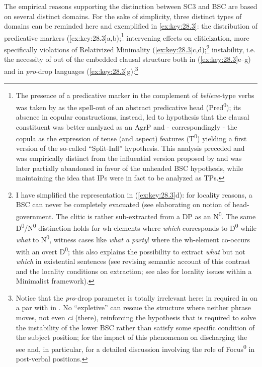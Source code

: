 \documentclass[output=paper]{langsci/langscibook}
\begin{document}
The empirical reasons supporting the distinction between \gls{SC3} and
\gls{BSC} are based on several distinct domains. For the sake of simplicity,
three distinct types of domains can be reminded here and exemplified in
\eqref{ex:key:28.3}: the distribution of predicative markers
(\ref{ex:key:28.3}a,b);\footnote{The presence of a predicative
    marker in the complement of \emph{believe}-type verbs was taken by
    \citet{Moro1988} as the spell-out of an abstract
    predicative head (Pred\textsuperscript{0}); its absence in
    copular constructions, instead, led to hypothesis that the
    clausal constituent was better analyzed as an AgrP and - correspondingly -
    the copula as the expression of tense (and aspect) features
    (T\textsuperscript{0}) yielding a first version of the so-called
    “Split-Infl” hypothesis. This analysis preceded and was empirically
    distinct from the influential version proposed by \citet{Pollock1989} and
was later partially abandoned in favor of the unheaded \gls{BSC} hypothesis,
while maintaining the idea that IPs were in fact to be analyzed as TPs.}
intervening effects on cliticization, more specifically violations of
 Relativized Minimality (\ref{ex:key:28.3}c,d);\footnote{I
    have simplified the representation in (\ref{ex:key:28.3}d): for locality
    reasons, a \gls{BSC} can never be completely evacuated (see
    \citet{Moro1993} elaborating on  notion of
    head-government. The clitic is rather sub-extracted from a DP as an
    N\textsuperscript{0}. The same D\textsuperscript{0}/N\textsuperscript{0}
    distinction holds for wh-elements where \emph{which} corresponds to
    D\textsuperscript{0} while \emph{what} to N\textsuperscript{0}, witness
    cases like \emph{what a party}! where the wh-element co-occurs with an
    overt D\textsuperscript{0}; this also explains the possibility to extract
    \emph{what} but not \emph{which} in existential sentences (see
    \citealt{Moro1997} revising  semantic account of this contrast
    and the locality conditions on extraction; see also \citealt{Moro1993} for
locality issues within a Minimalist framework).} instability, i.e. the
necessity of  out of the embedded clausal structure both in 
(\ref{ex:key:28.3}e--g) and in \emph{pro}-drop languages
(\ref{ex:key:28.3}g):\footnote{Notice that the \emph{pro}-drop parameter is
    totally irrelevant here:  in required in  on a par with in
    . No “expletive” can rescue the structure where neither phrase
    moves, not even \emph{ci} (there), reinforcing the hypothesis that 
    is required to solve the instability of the lower \gls{BSC} rather than
    satisfy some specific condition of the subject position; for the impact of
    this phenomenon on discharging the  see
    \citet{Moro1997,Moro2000} and, in particular, \citet{Moro2009} for a
    detailed discussion involving the role of Focus\textsuperscript{0} in
post-verbal positions.}
\end{document}
